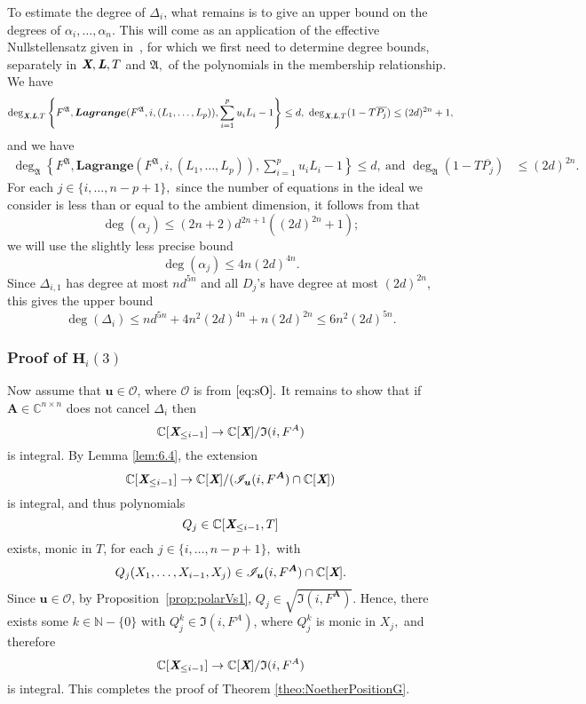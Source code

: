 \documentclass[12pt]{article}
\def\sO{\mathscr{O}}
\def\A{\mathfrak{A}}
\def\Lb{\textit{\textbf{L}}}
\def\Xb{\textit{\textbf{X}}}
\def\mA{{\bm A}}
\def\ub{{\bm u}}
\def\pjb{\overline{P_{j}}}
\def\D{\Delta}
\def\C{\mathbb{C}}
\def\IiA{\mathfrak{I}(i,F^A)}
\def\IiAr{\sqrt{\mathfrak{I}(i,F^{\mA})}}
\def\lagFfA{{\bm{Lagrange}}(F^{\A},i,(L_1,\hdots,L_p))}
\def\IilA{\mathscr{I}_{\ub}(i,F^{\mA})}
\def\udl{\sum_{i=1}^pu_iL_i}
\begin{document}
\noindent
To estimate the degree of $\D_{i}$, what remains is to give an upper
bound on the degrees of $\alpha_i,\dots,\alpha_n$. This will come as an
application of the effective Nullstellensatz given in~\cite{EN}, for
which we first need to determine degree bounds, separately in $\Xb,\Lb,T$
and $\A,$ of the polynomials in the membership relationship. We have
\begin{align*}
\deg_{\Xb,\Lb,T}
\left\{ 
F^{\A},\lagFfA, \udl-1
\right\}
\leq d, ~
\deg_{\Xb,\Lb,T}(1-T\pjb) \leq (2d)^{2n} +1, 
\end{align*}
and we have 
\begin{align*}
\deg_{\A}  
\left\{ 
F^{\A},\lagFfA, \udl-1
\right\} 
\leq d,~\textrm{and }
\deg_{\A}(1-T\pjb)& \leq (2d)^{2n}.
\end{align*}
For each $j \in \{i,\hdots,n-p+1\},$ since  the number of equations in the ideal we consider is less than or equal to the ambient dimension, it follows from \cite[Theorem 0.5]{EN} that  
\[
\deg(\alpha_j) \le (2n+2)d^{2n+1}((2d)^{2n}+1);
\]
we will use
the slightly less precise bound \[\deg(\alpha_j) \le 4n(2d)^{4n}.\] Since $\D_{i,1}$ has degree at most
$nd^{5n}$ and all $D_j$'s have degree at most $(2d)^{2n}$, this gives
the upper bound
$$\deg(\D_i) \le nd^{5n} +  4n^2(2d)^{4n} + n(2d)^{2n} \leq 6n^2(2d)^{5n}.$$


\subsubsection{Proof of $\textbf{H}_i(3)$}
Now assume that $\ub \in \mathscr{O}$, where $\sO$ is from $\eqref{eq:sO}.$ It remains to show that if $\mA \in \C^{n\times n}$ does not cancel $\D_{i}$ then
\[
 \C[\Xb_{\leq i-1}]\rightarrow \C[\Xb]/\IiA
\]
is integral. 
\noindent
By Lemma \ref{lem:6.4}, the extension
\[
 \C[\Xb_{\leq i-1}]\rightarrow \C[\Xb]/(\IilA \cap \C[\Xb])
\]
is integral, and thus polynomials 
\[
Q_j \in \C[\Xb_{\leq i-1},T]
\]
exists, monic in $T$, for each $j \in \{i,\hdots,n-p+1\},$ with
\begin{align*}
Q_j(X_1,\hdots,X_{i-1},X_j) \in \IilA \cap \C[\Xb].
\end{align*}
%
Since $\ub \in \sO$, by Proposition~\ref{prop:polarVs1}, $Q_j \in \IiAr.$ Hence, there exists some $k \in \mathbb{N}-\{0\}$ with $Q_j^{k} \in\IiA$, where $Q_j^k$ is monic in $X_j,$ and therefore
\[
 \C[\Xb_{\leq i-1}]\rightarrow \C[\Xb]/\IiA
\]
is integral. This completes the proof of Theorem \ref{theo:NoetherPositionG}.
\end{document}
